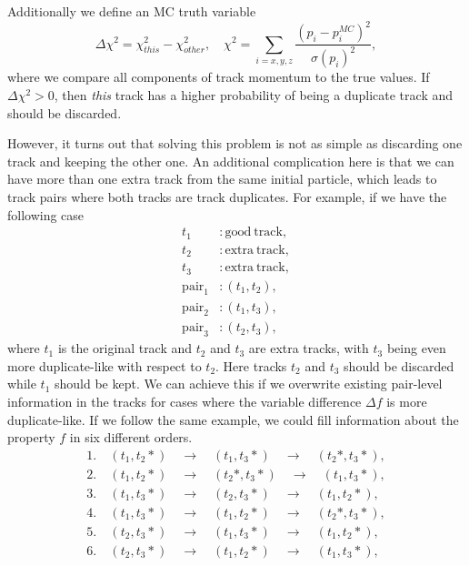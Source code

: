 Additionally we define an MC truth variable 
\begin{equation}
\label{eq:chi2}
\Delta \chi^2 = \chi^2_{this} - \chi^2_{other},\quad\chi^2 = \sum_{i=x,y,z}\frac{\left(p_i - p_i^{MC}\right)^2}{\sigma(p_i)^2},
\end{equation}
where we compare all components of track momentum to the true values. If $\Delta \chi^2 > 0$, then \textit{this} track has a higher probability of being a duplicate track and should be discarded.

However, it turns out that solving this problem is not as simple as discarding one track and keeping the other one. An additional complication here is that we can have more than one extra track from the same initial particle, which leads to track pairs where both tracks are track duplicates. For example, if we have the following case
\begin{align*}
t_1&: \mathrm{good~track},\\
t_2&: \mathrm{extra~track},\\
t_3&: \mathrm{extra~track},\\
\mathrm{pair}_1&:\left(t_1,t_2\right),\\
\mathrm{pair}_2&:\left(t_1,t_3\right),\\
\mathrm{pair}_3&:\left(t_2,t_3\right),
\end{align*}
where $t_1$ is the original track and $t_2$ and $t_3$ are extra tracks, with $t_3$ being even more duplicate-like with respect to $t_2$. Here tracks $t_2$ and $t_3$ should be discarded while $t_1$ should be kept. We can achieve this if we overwrite existing pair-level information in the tracks for cases where the variable difference $\Delta f$ is more duplicate-like. If we follow the same example, we could fill information about the property $f$ in six different orders. 
\begin{align*}
1.&~\left(t_1,t_2*\right)\quad \to \quad \left(t_1,t_3*\right)\quad \to \quad \left(t_2*,t_3*\right),\\ 
2.&~\left(t_1,t_2*\right)\quad \to \quad \left(t_2*,t_3*\right)\quad \to \quad \left(t_1,t_3*\right),\\ 
3.&~\left(t_1,t_3*\right)\quad \to \quad \left(t_2,t_3*\right)\quad \to \quad \left(t_1,t_2*\right),\\
4.&~\left(t_1,t_3*\right)\quad \to \quad \left(t_1,t_2*\right)\quad \to \quad \left(t_2*,t_3*\right),\\
5.&~\left(t_2,t_3*\right)\quad \to \quad \left(t_1,t_3*\right)\quad \to \quad \left(t_1,t_2*\right),\\
6.&~\left(t_2,t_3*\right)\quad \to \quad \left(t_1,t_2*\right)\quad \to \quad \left(t_1,t_3*\right),
\end{align*}

